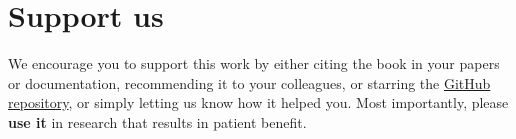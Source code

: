 \documentclass[
  letterpaper,
  oneside,
  open=any]{scrbook}
\begin{document}
\section*{Support us}\label{support-us}


We encourage you to support this work by either citing the book in your
papers or documentation, recommending it to your colleagues, or starring
the \href{https://github.com/OHDSI/Tidy-R-programming-with-OMOP}{GitHub
repository}, or simply letting us know how it helped you. Most
importantly, please \textbf{use it} in research that results in patient
benefit.


\backmatter
\end{document}
